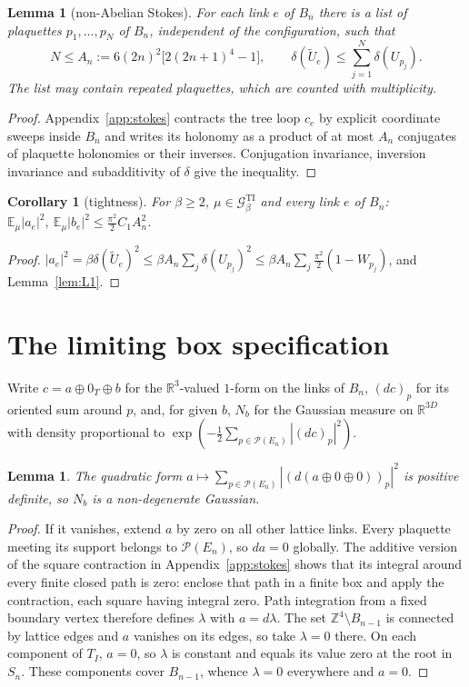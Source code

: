 \documentclass[11pt,a4paper]{article}
\theoremstyle{plain}
\newtheorem{lemma}[theorem]{Lemma}
\newtheorem{corollary}[theorem]{Corollary}
\theoremstyle{definition}
\theoremstyle{remark}
\numberwithin{equation}{section}
\newcommand{\R}{\mathbb{R}}
\newcommand{\Z}{\mathbb{Z}}
\newcommand{\E}{\mathbb{E}}
\newcommand{\cP}{\mathcal{P}}
\newcommand{\cG}{\mathcal{G}}
\newcommand{\Tg}{\widetilde U}
\begin{document}
\begin{lemma}[non-Abelian Stokes]\label{lem:stokes}
For each link $e$ of $B_n$ there is a list of plaquettes $p_1,\dots,p_N$ of $B_n$, independent of the configuration, such that
\[
N\le A_n:=6(2n)^2\bigl[2(2n+1)^4-1\bigr],
\qquad
\delta(\Tg_e)\le\sum_{j=1}^N\delta(U_{p_j}).
\]
The list may contain repeated plaquettes, which are counted with multiplicity.
\end{lemma}
\begin{proof}
Appendix~\ref{app:stokes} contracts the tree loop $c_e$ by explicit coordinate sweeps inside $B_n$ and writes its holonomy as a product
of at most $A_n$ conjugates of plaquette holonomies or their inverses. Conjugation invariance, inversion invariance and subadditivity
of $\delta$ give the inequality.
\end{proof}

\begin{corollary}[tightness]\label{cor:tight}
For $\beta\ge2$, $\mu\in\cG^{\mathrm{TI}}_\beta$ and every link $e$ of $B_n$: $\E_\mu|a_e|^2,\ \E_\mu|b_e|^2\le\frac{\pi^2}2C_1A_n^2$.
\end{corollary}
\begin{proof}
$|a_e|^2=\beta\delta(\Tg_e)^2\le\beta A_n\sum_j\delta(U_{p_j})^2\le\beta A_n\sum_j\frac{\pi^2}2(1-W_{p_j})$, and Lemma~\ref{lem:L1}.
\end{proof}

\section{The limiting box specification}\label{sec:S}

Write $c=a\oplus0_T\oplus b$ for the $\R^3$-valued $1$-form on the links of $B_n$, $(dc)_p$ for its oriented sum around $p$, and, for given
$b$, $N_b$ for the Gaussian measure on $\R^{3D}$ with density proportional to $\exp(-\frac12\sum_{p\in\cP(E_n)}|(dc)_p|^2)$.

\begin{lemma}\label{lem:nondeg}
The quadratic form $a\mapsto\sum_{p\in\cP(E_n)}|(d(a\oplus0\oplus0))_p|^2$ is positive definite, so $N_b$ is a non-degenerate Gaussian.
\end{lemma}
\begin{proof}
If it vanishes, extend $a$ by zero on all other lattice links. Every plaquette meeting its support belongs to $\cP(E_n)$,
so $da=0$ globally. The additive version of the square contraction in Appendix~\ref{app:stokes} shows that its integral around
every finite closed path is zero: enclose that path in a finite box and apply the contraction, each square having integral zero.
Path integration from a fixed boundary vertex therefore defines $\lambda$ with $a=d\lambda$.
The set $\Z^4\setminus B_{n-1}$ is connected by lattice edges and $a$ vanishes on its edges, so take $\lambda=0$ there.
On each component of $T_I$, $a=0$, so $\lambda$ is constant and equals its value zero at the root in $S_n$.
These components cover $B_{n-1}$, whence $\lambda=0$ everywhere and $a=0$.
\end{proof}
\end{document}
